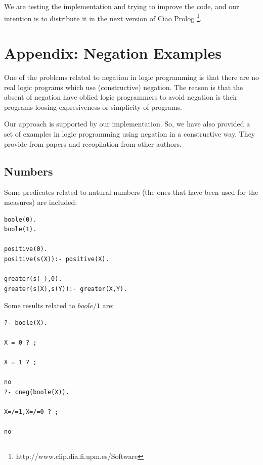 \documentclass{tlp}
\begin{document}
We are testing the implementation and trying to improve the code, and
our intention is to distribute it in the next version of Ciao Prolog
\footnote{http://www.clip.dia.fi.upm.es/Software}.
  





\newpage

\appendix

\section*{Appendix: Negation Examples}

One of the problems related to negation in logic programming is that there are
no real logic programs which use (constructive) negation. The reason is that
the absent of negation have oblied logic programmers to avoid negation is
their programs loosing expresiveness or simplicity of programs.

Our approach is supported by our implementation. So, we have also provided a
set of examples in logic programming using negation in a constructive
way. They provide from papers and recopilation from other authors.

\subsection*{Numbers}

Some predicates related to natural numbers (the ones that have been used for
the measures) are included:
\begin{small}
\begin{verbatim}
boole(0).
boole(1).

positive(0).
positive(s(X)):- positive(X).

greater(s(_),0).
greater(s(X),s(Y)):- greater(X,Y).
\end{verbatim}
\end{small}

Some results related to $boole/1$ are:
\begin{small}
\begin{verbatim}
?- boole(X).

X = 0 ? ;

X = 1 ? ;

no
?- cneg(boole(X)).

X=/=1,X=/=0 ? ;

no
\end{verbatim}
\end{small}
\end{document}
